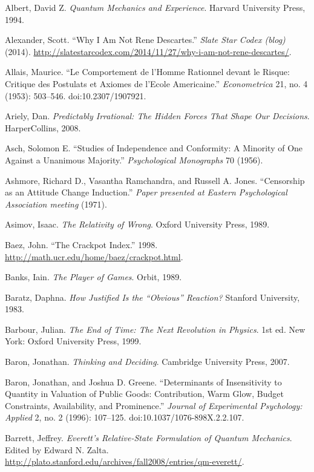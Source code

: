 

{
 Albert, David Z. \textit{Quantum Mechanics and Experience}.
Harvard University Press, 1994.}

{
 Alexander, Scott. ``Why I Am Not Rene
Descartes.'' \textit{Slate Star Codex (blog)} (2014).
\url{http://slatestarcodex.com/2014/11/27/why-i-am-not-rene-descartes/}.}

{
 Allais, Maurice. ``Le Comportement de
l'Homme Rationnel devant le Risque: Critique des
Postulats et Axiomes de l'Ecole
Americaine.'' \textit{Econometrica} 21, no. 4 (1953):
503--546. doi:10.2307/1907921.}

{
 Ariely, Dan. \textit{Predictably Irrational: The Hidden Forces
That Shape Our Decisions}. HarperCollins, 2008.}

{
 Asch, Solomon E. ``Studies of Independence and
Conformity: A Minority of One Against a Unanimous
Majority.'' \textit{Psychological Monographs} 70
(1956).}

{
 Ashmore, Richard D., Vasantha Ramchandra, and Russell A. Jones.
``Censorship as an Attitude Change
Induction.'' \textit{Paper presented at Eastern
Psychological Association meeting} (1971).}

{
 Asimov, Isaac. \textit{The Relativity of Wrong}. Oxford University
Press, 1989.}

{
 Baez, John. ``The Crackpot
Index.'' 1998.
\url{http://math.ucr.edu/home/baez/crackpot.html}.}

{
 Banks, Iain. \textit{The Player of Games}. Orbit, 1989.}

{
 Baratz, Daphna. \textit{How Justified Is the
``Obvious'' Reaction?} Stanford
University, 1983.}

{
 Barbour, Julian. \textit{The End of Time: The Next Revolution in
Physics}. 1st ed. New York: Oxford University Press, 1999.}

{
 Baron, Jonathan. \textit{Thinking and Deciding}. Cambridge
University Press, 2007.}

{
 Baron, Jonathan, and Joshua D. Greene.
``Determinants of Insensitivity to Quantity in
Valuation of Public Goods: Contribution, Warm Glow, Budget Constraints,
Availability, and Prominence.'' \textit{Journal of
Experimental Psychology: Applied} 2, no. 2 (1996): 107--125.
doi:10.1037/1076-898X.2.2.107.}

{
 Barrett, Jeffrey. \textit{Everett's Relative-State
Formulation of Quantum Mechanics}. Edited by Edward N. Zalta.
\url{http://plato.stanford.edu/archives/fall2008/entries/qm-everett/}.}

